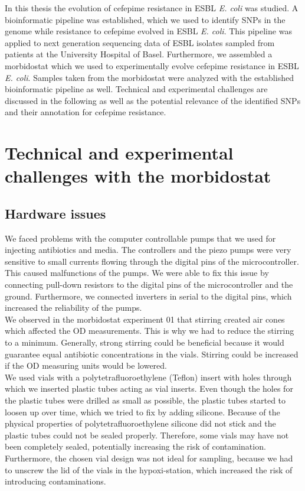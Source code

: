 In this thesis the evolution of cefepime resistance in ESBL \textit{E. coli} was studied. A bioinformatic pipeline was established, which we used to identify SNPs in the genome while resistance to cefepime evolved in ESBL \textit{E. coli}. This pipeline was applied to next generation sequencing data of ESBL isolates sampled from patients at the University Hospital of Basel. Furthermore, we assembled a morbidostat which we used to experimentally evolve cefepime resistance in ESBL \textit{E. coli}. Samples taken from the morbidostat were analyzed with the established bioinformatic pipeline as well. 
Technical and experimental challenges are discussed in the following as well as the potential relevance of the identified SNPs and their annotation for cefepime resistance.

\section{Technical and experimental challenges with the morbidostat}
\subsection{Hardware issues}
We faced problems with the computer controllable pumps that we used for injecting antibiotics and media. The controllers and the piezo pumps were very sensitive to small currents flowing through the digital pins of the microcontroller. This caused malfunctions of the pumps. We were able to fix this issue by connecting pull-down resistors to the digital pins of the microcontroller and the ground. Furthermore, we connected inverters in serial to the digital pins, which increased the reliability of the pumps.\\
We observed in the morbidostat experiment 01 that stirring created air cones which affected the OD measurements. This is why we had to reduce the stirring to a minimum. Generally, strong stirring could be beneficial because it would guarantee equal antibiotic concentrations in the vials. Stirring could be increased if the OD measuring units would be lowered. \\
We used vials with a polytetrafluoroethylene (Teflon) insert with holes through which we inserted plastic tubes acting as vial inserts. Even though the holes for the plastic tubes were drilled as small as possible, the plastic tubes started to loosen up over time, which we tried to fix by adding silicone. Because of the physical properties of polytetrafluoroethylene silicone did not stick and the plastic tubes could not be sealed properly. Therefore, some vials may have not been completely sealed, potentially increasing the risk of contamination. Furthermore, the chosen vial design was not ideal for sampling, because we had to unscrew the lid of the vials in the hypoxi-station, which increased the risk of introducing contaminations.
